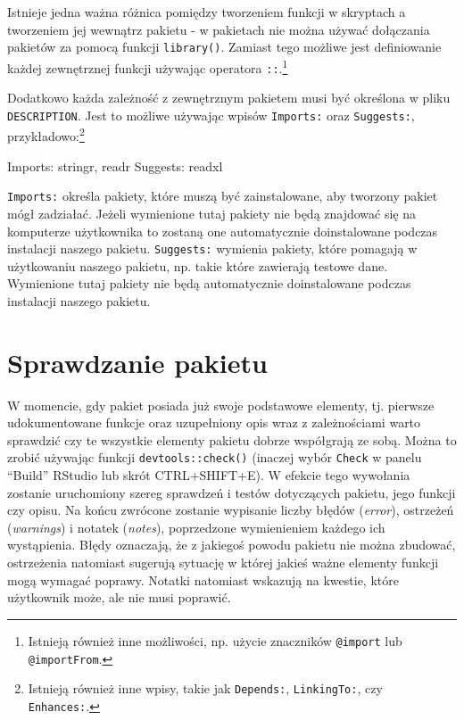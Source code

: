 \documentclass[paper=6in:9in,pagesize=pdftex,headinclude=on,footinclude=on,10pt]{scrbook}
\newenvironment{Shaded}{\begin{snugshade}}{\end{snugshade}}
\newcommand{\FunctionTok}[1]{\textcolor[rgb]{0.00,0.00,0.00}{#1}}
\newcommand{\NormalTok}[1]{#1}
\begin{document}
Istnieje jedna ważna różnica pomiędzy tworzeniem funkcji w skryptach a tworzeniem jej wewnątrz pakietu - w pakietach nie można używać dołączania pakietów za pomocą funkcji \texttt{library()}.
Zamiast tego możliwe jest definiowanie każdej zewnętrznej funkcji używając operatora \texttt{::}.\footnote{Istnieją również inne możliwości, np. użycie znaczników \texttt{@import} lub \texttt{@importFrom}.}

Dodatkowo każda zależność z zewnętrznym pakietem musi być określona w pliku \texttt{DESCRIPTION}.
Jest to możliwe używając wpisów \texttt{Imports:} oraz \texttt{Suggests:}, przykładowo:\footnote{Istnieją również inne wpisy, takie jak \texttt{Depends:}, \texttt{LinkingTo:}, czy \texttt{Enhances:}.}

\begin{Shaded}
\begin{Highlighting}[]
\FunctionTok{Imports:}
\NormalTok{  stringr,}
\NormalTok{  readr}
\FunctionTok{Suggests:}
\NormalTok{  readxl}
\end{Highlighting}
\end{Shaded}

\texttt{Imports:} określa pakiety, które muszą być zainstalowane, aby tworzony pakiet mógł zadziałać.
Jeżeli wymienione tutaj pakiety nie będą znajdować się na komputerze użytkownika to zostaną one automatycznie doinstalowane podczas instalacji naszego pakietu.
\texttt{Suggests:} wymienia pakiety, które pomagają w użytkowaniu naszego pakietu, np. takie które zawierają testowe dane.
Wymienione tutaj pakiety nie będą automatycznie doinstalowane podczas instalacji naszego pakietu.

\hypertarget{sprawdzanie-pakietu}{%
\section{Sprawdzanie pakietu}\label{sprawdzanie-pakietu}}

W momencie, gdy pakiet posiada już swoje podstawowe elementy, tj. pierwsze udokumentowane funkcje oraz uzupełniony opis wraz z zależnościami warto sprawdzić czy te wszystkie elementy pakietu dobrze współgrają ze sobą.
Można to zrobić używając funkcji \texttt{devtools::check()} (inaczej wybór \texttt{Check} w panelu ``Build'' RStudio lub skrót CTRL+SHIFT+E).
W efekcie tego wywołania zostanie uruchomiony szereg sprawdzeń i testów dotyczących pakietu, jego funkcji czy opisu.
Na końcu zwrócone zostanie wypisanie liczby błędów (\emph{error}), ostrzeżeń (\emph{warnings}) i notatek (\emph{notes}), poprzedzone wymienieniem każdego ich wystąpienia.
Błędy oznaczają, że z jakiegoś powodu pakietu nie można zbudować, ostrzeżenia natomiast sugerują sytuację w której jakieś ważne elementy funkcji mogą wymagać poprawy.
Notatki natomiast wskazują na kwestie, które użytkownik może, ale nie musi poprawić.
\end{document}
